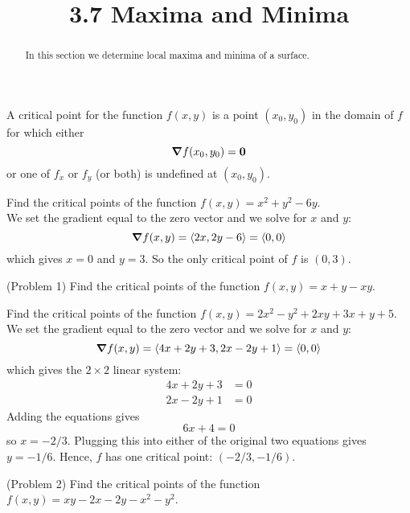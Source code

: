\documentclass[handout]{ximera}
\title{3.7 Maxima and Minima}
\begin{document}
\begin{abstract}
In this section we determine local maxima and minima of a surface.
\end{abstract}

\maketitle

\begin{definition}
A critical point for the function $f(x,y)$ is a point $(x_0, y_0)$ in the domain of $f$ for which either
\[
\boldsymbol\nabla f(x_0, y_0) = \mathbf 0
\]
or one of $f_x$ or $f_y$ (or both) is undefined at $(x_0, y_0)$.
\end{definition}

\begin{example}[Example 1]
Find the critical points of the function $f(x,y) = x^2 + y^2 - 6y$.\\
We set the gradient equal to the zero vector and we solve for $x$ and $y$:
\[
\boldsymbol\nabla f(x,y) = \left\langle 2x, 2y -6\right\rangle = \left\langle 0,0\right\rangle
\]
which gives $x = 0$ and $y = 3$.  So the only critical point of $f$ is $(0,3)$.
\end{example}

\begin{problem}(Problem 1)
Find the critical points of the function $f(x,y) = x+ y - xy$.
\end{problem}




\begin{example}[Example 2]
Find the critical points of the function $f(x,y) = 2x^2 - y^2 +2xy + 3x + y+ 5$.\\
We set the gradient equal to the zero vector and we solve for $x$ and $y$:
\[
\boldsymbol\nabla f(x,y) = \left\langle 4x+2y + 3, 2x - 2y + 1\right\rangle = \left\langle 0,0\right\rangle
\]
which gives the $2 \times 2$ linear system:
\begin{align*}
4x+2y + 3 &= 0\\
2x -2y + 1 & = 0
\end{align*}
Adding the equations gives 
\[
6x + 4 = 0
\]
so $x = -2/3$. Plugging this into either of the original two equations gives $y = -1/6$.
Hence, $f$ has one critical point: $(-2/3, -1/6)$.
\end{example}

\begin{problem}(Problem 2)
Find the critical points of the function $f(x,y) = xy - 2x-2y-x^2 - y^2$.
\end{problem}
\end{document}
